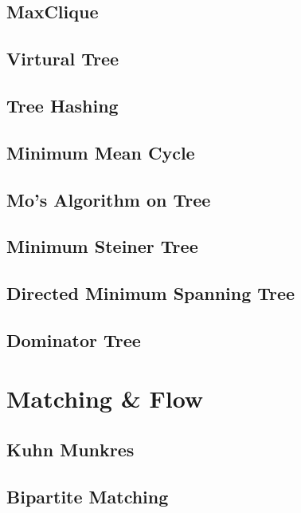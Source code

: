 \documentclass[a4paper,10pt,twocolumn,oneside]{article}
\begin{document}
\subsection{MaxClique}

\subsection{Virtural Tree}

\subsection{Tree Hashing}

\subsection{Minimum Mean Cycle}

\subsection{Mo's Algorithm on Tree}

\subsection{Minimum Steiner Tree}

\subsection{Directed Minimum Spanning Tree}

\subsection{Dominator Tree}


\section{Matching \& Flow}
\subsection{Kuhn Munkres}

\subsection{Bipartite Matching}

\end{document}

